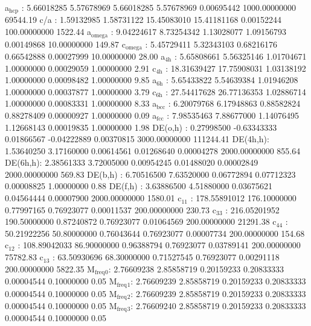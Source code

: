 \documentclass[11pt]{article}
\begin{document}
a\(_{\text{hcp}}\)   :   5.66018285   5.57678969   5.66018285   5.57678969   0.00695442 1000.00000000     69544.19
c/a     :   1.59132985   1.58731122  15.45083010  15.41181168   0.00152244 100.00000000      1522.44
a\(_{\text{omega}}\) :   9.04224617   8.73254342   1.13028077   1.09156793   0.00149868  10.00000000       149.87
c\(_{\text{omega}}\) :   5.45729411   5.32343103   0.68216176   0.66542888   0.00027999  10.00000000        28.00
a\(_{\text{4h}}\)    :   5.65808661   5.56325146   1.01704671   1.00000000   0.00029059   1.00000000         2.91
c\(_{\text{4h}}\)    :  18.31639427  17.75908031   1.03138192   1.00000000   0.00098482   1.00000000         9.85
a\(_{\text{6h}}\)    :   5.65433822   5.54639384   1.01946208   1.00000000   0.00037877   1.00000000         3.79
c\(_{\text{6h}}\)    :  27.54417628  26.77136353   1.02886714   1.00000000   0.00083331   1.00000000         8.33
a\(_{\text{bcc}}\)   :   6.20079768   6.17948863   0.88582824   0.88278409   0.00000927   1.00000000         0.09
a\(_{\text{fcc}}\)   :   7.98535463   7.88677000   1.14076495   1.12668143   0.00019835   1.00000000         1.98
DE(o,h) :   0.27998500  -0.63343333   0.01866567  -0.04222889   0.00370815 3000.00000000    111244.41
DE(4h,h):   1.53640250   3.17160000   0.00614561   0.01268640   0.00004278 2000.00000000       855.64
DE(6h,h):   2.38561333   3.72005000   0.00954245   0.01488020   0.00002849 2000.00000000       569.83
DE(b,h) :   6.70516500   7.63520000   0.06772894   0.07712323   0.00008825   1.00000000         0.88
DE(f,h) :   3.63886500   4.51880000   0.03675621   0.04564444   0.00007900 2000.00000000      1580.01
c\(_{\text{11}}\)    : 178.55891012 176.10000000   0.77997165   0.76923077   0.00011537 200.00000000       230.73
c\(_{\text{33}}\)    : 216.05201952 190.50000000   0.87240872   0.76923077   0.01064569 200.00000000     21291.38
c\(_{\text{44}}\)    :  50.21922256  50.80000000   0.76043644   0.76923077   0.00007734 200.00000000       154.68
c\(_{\text{12}}\)    : 108.89042033  86.90000000   0.96388794   0.76923077   0.03789141 200.00000000     75782.83
c\(_{\text{13}}\)    :  63.50930696  68.30000000   0.71527545   0.76923077   0.00291118 200.00000000      5822.35
M\(_{\text{freq}}\)\(_{\text{0}}\):   2.76609238   2.85858719   0.20159233   0.20833333   0.00004544   0.10000000         0.05
M\(_{\text{freq}}\)\(_{\text{1}}\):   2.76609239   2.85858719   0.20159233   0.20833333   0.00004544   0.10000000         0.05
M\(_{\text{freq}}\)\(_{\text{2}}\):   2.76609239   2.85858719   0.20159233   0.20833333   0.00004544   0.10000000         0.05
M\(_{\text{freq}}\)\(_{\text{3}}\):   2.76609240   2.85858719   0.20159233   0.20833333   0.00004544   0.10000000         0.05
\end{document}
